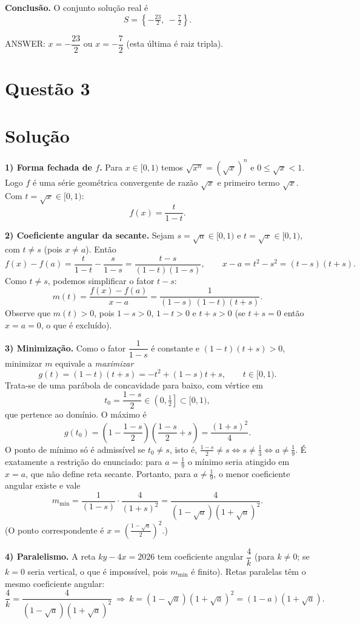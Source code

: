 \documentclass{article}%
\begin{document}
\textbf{Conclusão.} O conjunto solução real é
\[
S=\left\{-\tfrac{23}{2},\ -\tfrac{7}{2}\right\}.
\]

ANSWER: $x=-\dfrac{23}{2}$ ou $x=-\dfrac{7}{2}$ (esta última é raiz tripla).%
\newpage%
\section*{Questão 3}

\section*{Solução}

\textbf{1) Forma fechada de $f$.} Para $x\in[0,1)$ temos $\sqrt{x^n}=(\sqrt{x})^n$ e $0\le\sqrt{x}<1$. Logo $f$ é uma série geométrica convergente de razão $\sqrt{x}$ e primeiro termo $\sqrt{x}$. Com $t=\sqrt{x}\in[0,1)$:
\[
f(x)=\frac{t}{1-t}.
\]

\textbf{2) Coeficiente angular da secante.} Sejam $s=\sqrt{a}\in[0,1)$ e $t=\sqrt{x}\in[0,1)$, com $t\neq s$ (pois $x\neq a$). Então
\[
f(x)-f(a)=\frac{t}{1-t}-\frac{s}{1-s}=\frac{t-s}{(1-t)(1-s)},\qquad x-a=t^2-s^2=(t-s)(t+s).
\]
Como $t\neq s$, podemos simplificar o fator $t-s$:
\[
m(t)=\frac{f(x)-f(a)}{x-a}=\frac{1}{(1-s)\,(1-t)(t+s)} .
\]
Observe que $m(t)>0$, pois $1-s>0$, $1-t>0$ e $t+s>0$ (se $t+s=0$ então $x=a=0$, o que é excluído).

\textbf{3) Minimização.} Como o fator $\dfrac{1}{1-s}$ é constante e $(1-t)(t+s)>0$, minimizar $m$ equivale a \emph{maximizar}
\[
g(t)=(1-t)(t+s)=-t^2+(1-s)t+s,\qquad t\in[0,1).
\]
Trata-se de uma parábola de concavidade para baixo, com vértice em
\[
t_0=\frac{1-s}{2}\in\left(0,\tfrac12\right]\subset[0,1),
\]
que pertence ao domínio. O máximo é
\[
g(t_0)=\left(1-\frac{1-s}{2}\right)\left(\frac{1-s}{2}+s\right)=\frac{(1+s)^2}{4}.
\]
O ponto de mínimo só é admissível se $t_0\neq s$, isto é, $\frac{1-s}{2}\neq s\iff s\neq\frac13\iff a\neq\frac19$. É exatamente a restrição do enunciado: para $a=\frac19$ o mínimo seria atingido em $x=a$, que não define reta secante. Portanto, para $a\neq\frac19$, o menor coeficiente angular existe e vale
\[
m_{\min}=\frac{1}{(1-s)}\cdot\frac{4}{(1+s)^2}=\frac{4}{(1-\sqrt a)(1+\sqrt a)^2}.
\]
(O ponto correspondente é $x=\left(\frac{1-\sqrt a}{2}\right)^2$.)

\textbf{4) Paralelismo.} A reta $ky-4x=2026$ tem coeficiente angular $\dfrac{4}{k}$ (para $k\neq0$; se $k=0$ seria vertical, o que é impossível, pois $m_{\min}$ é finito). Retas paralelas têm o mesmo coeficiente angular:
\[
\frac{4}{k}=\frac{4}{(1-\sqrt a)(1+\sqrt a)^2}\ \Longrightarrow\ k=(1-\sqrt a)(1+\sqrt a)^2=(1-a)(1+\sqrt a).
\]
\end{document}
